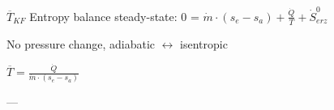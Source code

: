 \( \overline{T}_{KF} \)  
Entropy balance steady-state:  
0 = \( \dot{m} \cdot (s_{e} - s_{a}) + \frac{\dot{Q}}{T} + \dot{S}^{0}_{erz} \)  

No pressure change, adiabatic \( \leftrightarrow \) isentropic  

\( \overline{T} = \frac{\dot{Q}}{\dot{m} \cdot (s_{e} - s_{a})} \)  

---